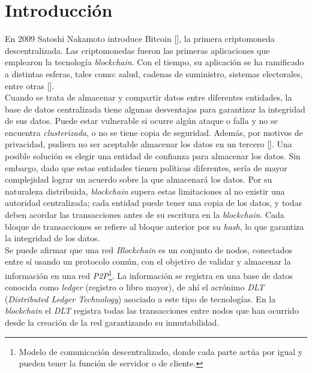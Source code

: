 \chapter*{Introducción}\label{chapter:introduction}


En 2009 Satoshi Nakamoto introduce Bitcoin [\cite{nakamoto2008bitcoin}], la primera criptomoneda descentralizada. Las criptomonedas fueron las primeras aplicaciones que emplearon la tecnolog\'ia \emph{blockchain}. Con el tiempo, su aplicaci\'on se ha ramificado a distintas esferas, tales como: salud, cadenas de suministro, sistemas electorales, entre otras [\cite{tama2017critical}].\\

Cuando se trata de almacenar y compartir datos entre diferentes entidades, la base de datos centralizada tiene algunas desventajas para garantizar la integridad de sus datos. Puede estar vulnerable si ocurre alg\'un ataque o falla y no se encuentra \emph{clusterizada}, o no se tiene copia de seguridad. Adem\'as, por motivos de privacidad, pudiera no ser aceptable almacenar los datos en un tercero [\cite{xu2017taxonomy}]. Una posible soluci\'on es elegir una entidad de confianza para almacenar los datos. Sin embargo, dado que estas entidades tienen pol\'iticas diferentes, ser\'ia de mayor complejidad lograr un acuerdo sobre la que almacenar\'a los datos. Por su naturaleza distribuida, \emph{blockchain} supera estas limitaciones al no existir una autoridad centralizada; cada entidad puede tener una copia de los datos, y todas deben acordar las transacciones antes de su escritura en la \emph{blockchain}. Cada bloque de transacciones se refiere al bloque anterior por su \emph{hash}, lo que garantiza la integridad de los datos.\\

Se puede afirmar que una red \emph{Blockchain} es un conjunto de nodos, conectados entre s\'i usando un protocolo com\'un, con el objetivo de validar y almacenar la informaci\'on en una red \emph{P2P}\footnote{Modelo de comunicaci\'on descentralizado, donde cada parte act\'ua por igual y pueden tener la funci\'on de servidor o de cliente.}. La informaci\'on se registra en una base de datos conocida como \emph{ledger} (registro o libro mayor), de ah\'i el acr\'onimo \emph{DLT} (\emph{Distributed Ledger Technology}) asociado a este tipo de tecnolog\'ias. En la \emph{blockchain} el \emph{DLT} registra todas las transacciones entre nodos que han ocurrido desde la creaci\'on de la red garantizando su inmutabilidad.\\


